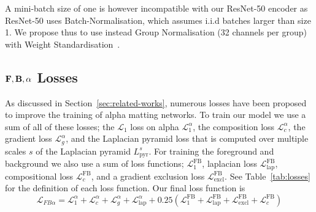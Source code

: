 \documentclass[runningheads]{llncs}
\begin{document}
A mini-batch size of one is however incompatible with our ResNet-50 encoder as
ResNet-50 uses Batch-Normalisation, which assumes i.i.d batches larger than size
1. We propose thus to use instead Group Normalisation (32 channels per group)
with Weight Standardisation~\cite{groupnorm,weightstandardization}.

\subsection{$\mathbf{{{F}}},\mathbf{{{B}}},\alpha$ Losses} 

As discussed in Section~\ref{sec:related-works}, numerous losses have been proposed to improve the training of alpha matting networks. To train our model we use a sum
of all of these losses; the $\mathcal{L}_1$ loss on alpha $\mathcal{L}^{\alpha}_1$, the composition loss $\mathcal{L}^{\alpha}_c$, the gradient
loss $\mathcal{L}^{\alpha}_g$, and the Laplacian pyramid loss that is computed over 
multiple scales $s$ of the Laplacian pyramid $L^s_{\mathrm{pyr}}$. For training the foreground and background we also use a sum of loss functions; $\mathcal{L}^{\mathrm{FB}}_1$, laplacian loss $\mathcal{L}^{\mathrm{FB}}_{\mathrm{lap}}$, compositional loss $\mathcal{L}^{\mathrm{FB}}_c$, and a gradient exclusion loss $\mathcal{L}^{\mathrm{FB}}_{\mathrm{excl}}$. See Table~\ref{tab:losses} for the definition of each loss function. 
Our final loss function is 
\begin{equation}
    \mathcal{L}_{FB\alpha} = \mathcal{L}^{\alpha}_1 +\mathcal{L}^{\alpha}_c+\mathcal{L}^{\alpha}_g+\mathcal{L}^{\alpha}_{\mathrm{lap}} + 0.25\left(
    \mathcal{L}^{\mathrm{FB}}_1 + 
    \mathcal{L}^{\mathrm{FB}}_{\mathrm{lap}} +
    \mathcal{L}^{\mathrm{FB}}_{\mathrm{excl}} +
    \mathcal{L}^{\mathrm{FB}}_c
    \right)
\end{equation}
\end{document}
